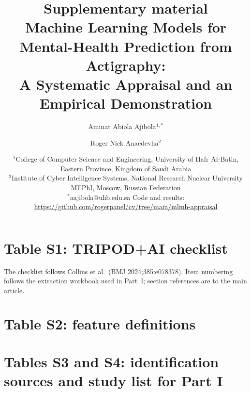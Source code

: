 \documentclass[11pt,a4paper]{article}
\title{Supplementary material\\[0.3em]\large Machine Learning Models for Mental-Health Prediction from Actigraphy:\\A Systematic Appraisal and an Empirical Demonstration}
\author{Aminat Abiola Ajibola$^{1,*}$ \and Roger Nick Anaedevha$^{2}$}
\date{\footnotesize $^{1}$College of Computer Science and Engineering, University of Hafr Al-Batin, Eastern Province, Kingdom of Saudi Arabia\\
$^{2}$Institute of Cyber Intelligence Systems, National Research Nuclear University MEPhI, Moscow, Russian Federation\\
$^{*}$aajibola@uhb.edu.sa \quad Code and results: \url{https://github.com/rogerpanel/cv/tree/main/mlmh-appraisal}}
\begin{document}
\maketitle
\tableofcontents

\section{Table S1: TRIPOD+AI checklist}
The checklist follows Collins et al.\ (BMJ 2024;385:e078378). Item numbering follows the
extraction workbook used in Part~I; section references are to the main article.


\section{Table S2: feature definitions}


\section{Tables S3 and S4: identification sources and study list for Part I}

\end{document}
